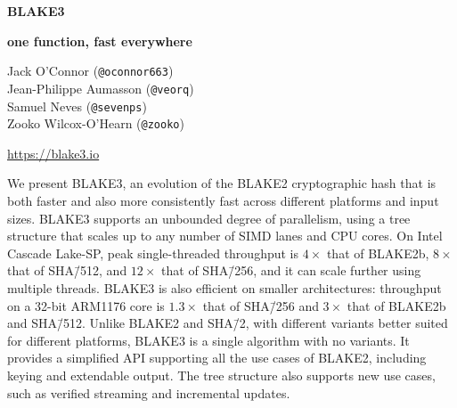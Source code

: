 \documentclass[11pt,notitlepage,a4paper]{article}
\title{\mytitle}
\newcommand{\mytitle}{BLAKE3}
\begin{document}
\selectfont
\pagestyle{plain}

{\let\thefootnote\relax{}}

\begin{center}
{\Huge \bf \mytitle}

\medskip

{\Large \bf  one function, fast everywhere}

\medskip

Jack O'Connor (\texttt{@oconnor663}) \\
Jean-Philippe Aumasson (\texttt{@veorq}) \\
Samuel Neves (\texttt{@sevenps}) \\
Zooko Wilcox-O'Hearn (\texttt{@zooko}) \\

\medskip

{\large \url{https://blake3.io}}

\end{center}


\medskip

\begin{center}
  \begin{minipage}{0.92\linewidth}

      We present BLAKE3, an evolution of the BLAKE2 cryptographic hash that is
      both faster and also more consistently fast across different platforms
      and input sizes. BLAKE3 supports an unbounded degree of parallelism,
      using a tree structure that scales up to any number of SIMD lanes and CPU
      cores. On Intel Cascade Lake-SP, peak single-threaded throughput is
      $4\times$ that of BLAKE2b, $8\times$ that of SHA\=/512, and $12\times$
      that of SHA\=/256, and it can scale further using multiple threads.
      BLAKE3 is also efficient on smaller architectures: throughput on a 32-bit
      ARM1176 core is $1.3\times$ that of SHA\=/256 and $3\times$ that of
      BLAKE2b and SHA\=/512. Unlike BLAKE2 and SHA\=/2, with different variants
      better suited for different platforms, BLAKE3 is a single algorithm with
      no variants. It provides a simplified API supporting all the use cases of
      BLAKE2, including keying and extendable output. The tree structure also
      supports new use cases, such as verified streaming and incremental
      updates.

   \end{minipage}
\end{center}

\newpage
\end{document}
